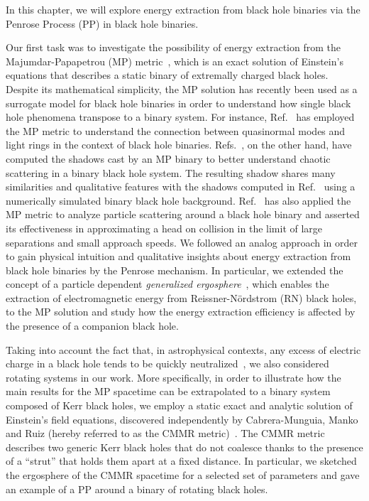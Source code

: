 In this chapter, we will explore energy extraction from black hole binaries via the Penrose Process (\ac{PP}) in black hole binaries.

Our first task was to investigate the possibility of energy extraction from the Majumdar-Papapetrou (\ac{MP}) metric~\cite{MAJUMDAR1947,PAPAPETROU1947}, which is an exact solution of Einstein's equations that describes a static binary of extremally charged black holes. Despite its mathematical simplicity, the \ac{MP} solution has recently been used as a surrogate model for black hole binaries in order to understand how single black hole phenomena transpose to a binary system. For instance, Ref.~\cite{ASSUMPCAO2018} has employed the \ac{MP} metric to understand the connection between quasinormal modes and light rings in the context of black hole binaries. Refs.~\cite{Shipley:2016omi,Shipley:2019kfq}, on the other hand, have computed the shadows cast by an \ac{MP} binary to better understand chaotic scattering in a binary black hole system. The resulting shadow shares many similarities and qualitative features with the shadows computed in Ref.~\cite{Bohn:2014xxa} using a numerically simulated binary black hole background. Ref.~\cite{BINI2019} has also applied the \ac{MP} metric to analyze particle scattering around a black hole binary and asserted its effectiveness in approximating a head on collision in the limit of large separations and small approach speeds. We followed an analog approach in order to gain physical intuition and qualitative insights about energy extraction from black hole binaries by the Penrose mechanism. In particular, we extended the concept of a particle dependent \emph{generalized ergosphere}~\cite{RUFFINI1971}, which enables the extraction of electromagnetic energy from Reissner-N\"ordstrom (RN) black holes, to the \ac{MP} solution and study how the energy extraction efficiency is affected by the presence of a companion black hole.

Taking into account the fact that, in astrophysical contexts, any excess of electric charge in a black hole tends to be quickly neutralized~\cite{gibbons1975}, we also considered rotating systems in our work. More specifically, in order to illustrate how the main results for the \ac{MP} spacetime can be extrapolated to a binary system composed of Kerr black holes, we employ a static exact and analytic solution of Einstein's field equations, discovered independently by Cabrera-Munguia, Manko and Ruiz (hereby referred to as the \ac{CMMR} metric)~\cite{cabrera_metric,manko_ruiz_metric, manko_ruiz_thermo}. The \ac{CMMR} metric describes two generic Kerr black holes that do not coalesce thanks to the presence of a ``strut'' that holds them apart at a fixed distance. In particular, we sketched the ergosphere of the \ac{CMMR} spacetime for a selected set of parameters and gave an example of a \ac{PP} around a binary of rotating black holes.

